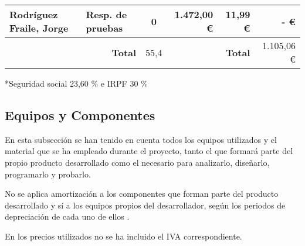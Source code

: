 \begin{table}[H]
{\begin{tabular}{ll|c|rr|r|}
			\multicolumn{1}{|l|}{Rodríguez Fraile, Jorge}                             & Resp. de pruebas                                            & 0                                      & \multicolumn{1}{r|}{1.472,00 €}                              & 11,99 €                                                                              & -   €                                                                                \\ \hline
			                                                                          & \multicolumn{1}{r|}{\textbf{Total}}                         & 55,4                                   & \multicolumn{1}{l}{}                                         & \textbf{Total}                                                                       & 1.105,06 €                                                                           \\ \cline{3-3} \cline{6-6}
		\end{tabular}%
	}
\end{table}

*Seguridad social 23,60 \% \cite{noauthor_seguridad_nodate} e IRPF 30 \% \cite{trecet_irpf_nodate}

\subsection{Equipos y Componentes}
En esta subsección se han tenido en cuenta todos los equipos utilizados y el material que se ha empleado durante el proyecto, tanto el que formará parte del propio producto desarrollado como el necesario para analizarlo, diseñarlo, programarlo y probarlo.

No se aplica amortización a los componentes que forman parte del producto desarrollado y sí a los equipos propios del desarrollador, según los periodos de depreciación de cada uno de ellos \cite{thiebaud_-muller_service_2018}.

En los precios utilizados no se ha incluido el IVA correspondiente.

